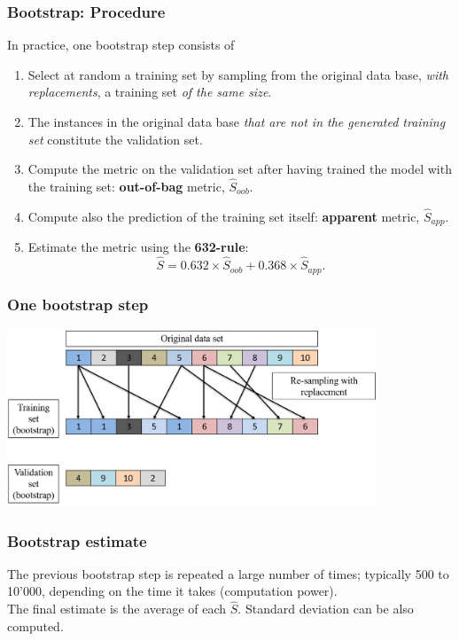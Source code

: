 \begin{frame}
\frametitle{Bootstrap: Procedure}
In practice, one bootstrap step consists of
\begin{enumerate}
\item Select at random a training set by sampling from the original data base, {\it with replacements}, a training set {\it of the same size}.
\item The instances in the original data base {\it that are not in the generated training set} constitute the validation set. 
\item Compute the metric on the validation set after having trained the model with the training set: {\bf out-of-bag} metric, $\hat{S}_{oob}$.
\item Compute also the prediction of the training set itself: {\bf apparent} metric, $\hat{S}_{app}$.
\item Estimate the metric using the {\bf 632-rule}:
$$
\hat{S} = 0.632 \times \hat{S}_{oob} + 0.368 \times \hat{S}_{app}.
$$
\end{enumerate}
\end{frame}
\begin{frame}
\frametitle{One bootstrap step}
\begin{center}
\includegraphics[width=11cm]{../Graphs/Bootstrap.png}
\end{center}
\end{frame}
\begin{frame}
\frametitle{Bootstrap estimate}
The previous bootstrap step is repeated a large number of times; typically 500 to 10'000, depending on the time it takes (computation power).\\ 
\vspace{0.3cm}
The final estimate is the average of each $\hat{S}$. Standard deviation can be also computed.\\
\vspace{0.3cm}
\end{frame}
